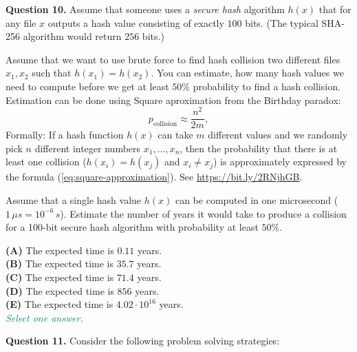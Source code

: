 \documentclass[jou]{apa6}
\begin{document}
\vspace{10pt}
{\bf Question 10.} Assume that someone uses
a {\em secure hash} algorithm $h(x)$ that for any file $x$
outputs a hash value consisting of exactly $100$
bits. (The typical SHA-256 algorithm would return $256$ bits.)

Assume that we want to use brute force to find 
hash collision \textendash{} two different files $x_1,x_2$
such that $h(x_1) = h(x_2)$. 
You can estimate, how many hash values we need to compute before we 
get at least $50\%$ probability to find a hash collision. 
Estimation can be done using Square aproximation from 
the Birthday paradox: 
\begin{equation}
\label{eq:square-approximation}
p_{\text{collision}} \approx \frac{n^2}{2m},
\end{equation}
Formally: If a hash function $h(x)$ can take $m$ different values and
we randomly pick $n$ different integer numbers $x_1,\ldots,x_n$, then the probability 
that there is at least one collision ($h(x_i) = h(x_j)$ and $x_i \neq x_j$) is approximately expressed by
the formula (\ref{eq:square-approximation}). See \url{https://bit.ly/2RNjhGB}.

Assume that a single hash value $h(x)$ can be computed in one microsecond
($1\,\mu{}s = 10^{-6}\,s$). Estimate the number of years it would take to produce a
collision for a 100-bit secure hash algorithm with probability at least $50\%$. 

{\bf (A)} The expected time is $0.11$ years.\\
{\bf (B)} The expected time is $35.7$ years.\\
{\bf (C)} The expected time is $71.4$ years.\\
{\bf (D)} The expected time is $856$ years.\\
{\bf (E)} The expected time is $4.02\cdot 10^{16}$ years.\\
\textcolor{teal}{\em Select one answer.}


\vspace{10pt}
{\bf Question 11.} Consider the following 
problem solving strategies: 
\end{document}
